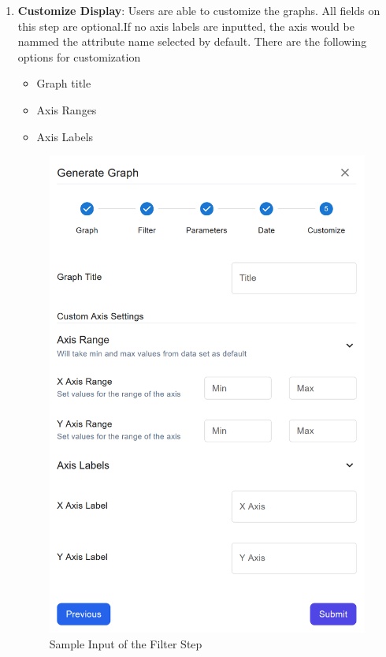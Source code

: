 \documentclass[12pt]{article}
\begin{document}
\begin{enumerate}
    \item \textbf{Customize Display}: \newline
    Users are able to customize the graphs. All fields on this step are
    optional.If no axis labels are inputted, the axis would be nammed the
    attribute name selected by default.
    \newline
    There are the following options for customization
    \begin{itemize}
        \item Graph title
        \item Axis Ranges
        \item Axis Labels
    \end{itemize}
    \begin{figure}[H]
        \centering
        \includegraphics[scale=0.6]{./Diagrams/graph-custom.png}
        \caption{Sample Input of the Filter Step}
        \label{fig:example}
    \end{figure}
\end{enumerate}
\end{document}
